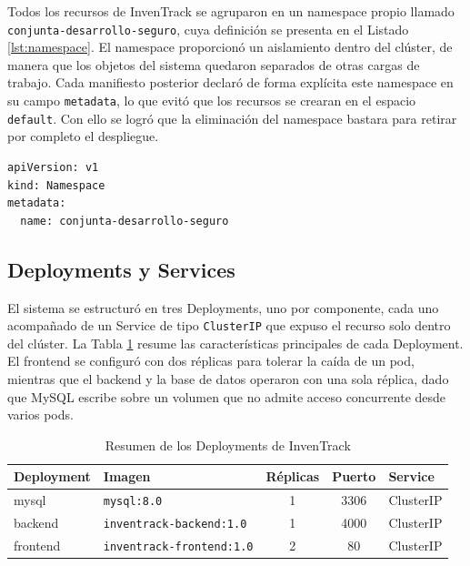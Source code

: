 \documentclass[stu,11pt,spanish,floatsintext]{apa7}
\begin{document}
Todos los recursos de InvenTrack se agruparon en un namespace propio llamado \texttt{conjunta-desarrollo-seguro}, cuya definición se presenta en el Listado \ref{lst:namespace}. El namespace proporcionó un aislamiento dentro del clúster, de manera que los objetos del sistema quedaron separados de otras cargas de trabajo. Cada manifiesto posterior declaró de forma explícita este namespace en su campo \texttt{metadata}, lo que evitó que los recursos se crearan en el espacio \texttt{default}. Con ello se logró que la eliminación del namespace bastara para retirar por completo el despliegue.

\begin{lstlisting}[caption={Definición del Namespace (00-namespace.yaml)},label=lst:namespace]
apiVersion: v1
kind: Namespace
metadata:
  name: conjunta-desarrollo-seguro
\end{lstlisting}

\subsection{Deployments y Services}

El sistema se estructuró en tres Deployments, uno por componente, cada uno acompañado de un Service de tipo \texttt{ClusterIP} que expuso el recurso solo dentro del clúster. La Tabla \ref{tab:deployments} resume las características principales de cada Deployment. El frontend se configuró con dos réplicas para tolerar la caída de un pod, mientras que el backend y la base de datos operaron con una sola réplica, dado que MySQL escribe sobre un volumen que no admite acceso concurrente desde varios pods.

\begin{table}[H]
  \centering
  \caption{Resumen de los Deployments de InvenTrack}
  \label{tab:deployments}
  \begin{tabularx}{\textwidth}{l l c c X}
    \toprule
    \textbf{Deployment} & \textbf{Imagen} & \textbf{Réplicas} & \textbf{Puerto} & \textbf{Service} \\
    \midrule
    mysql    & \texttt{mysql:8.0}             & 1 & 3306 & ClusterIP \\
    backend  & \texttt{inventrack-backend:1.0}  & 1 & 4000 & ClusterIP \\
    frontend & \texttt{inventrack-frontend:1.0} & 2 & 80   & ClusterIP \\
    \bottomrule
  \end{tabularx}
\end{table}
\end{document}
